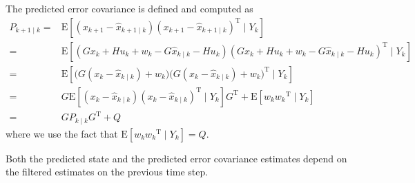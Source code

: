\documentclass[twoside]{article}
\renewcommand{\t}{^\mathrm{T}{}}
\newcommand{\E}{\mathrm{E}{}}
\renewcommand{\k}{_k{}}
\newcommand{\kp}{_{k+1}{}}
\newcommand{\kpk}{_{k+1\mid k}{}}
\newcommand{\kk}{_{k\mid k}{}}
\begin{document}
The predicted error covariance is defined and computed as
\begin{align*}
	P\kpk =& \E\left[(x\kp-\hat x\kpk)(x\kp-\hat x\kpk)\t \mid Y\k \right]\\
	=& \E\left[(G x\k + H u\k + w\k- G \hat x\kk - H u\k)(G x\k + H u\k + w\k- G \hat x\kk - H u\k)\t \mid Y\k \right]\\
	=& \E\left[\big(G (x\k-\hat x\kk) + w\k\big)\big(G (x\k-\hat x\kk) + w\k\big)\t \mid Y\k \right]\\
	=& G\E\left[(x\k-\hat x\kk)(x\k-\hat x\kk)\t \mid Y\k \right]G\t +  \E\left[ w\k w\k\t \mid Y\k \right] \\
	=& G P \kk G\t + Q
\end{align*} 
where we use the fact that $\E\left[ w\k w\k\t \mid Y\k \right] = Q$.

\begin{tcolorbox} [colback=blue!5!white,colframe=blue!75!black,title=\textbf{Remark}:,subtitle style={boxrule=0.4pt,
		colback=yellow!50!red!25!white}]
Both the predicted state and the predicted error covariance estimates depend on the filtered estimates on the previous time step.
\end{tcolorbox}
\end{document}
